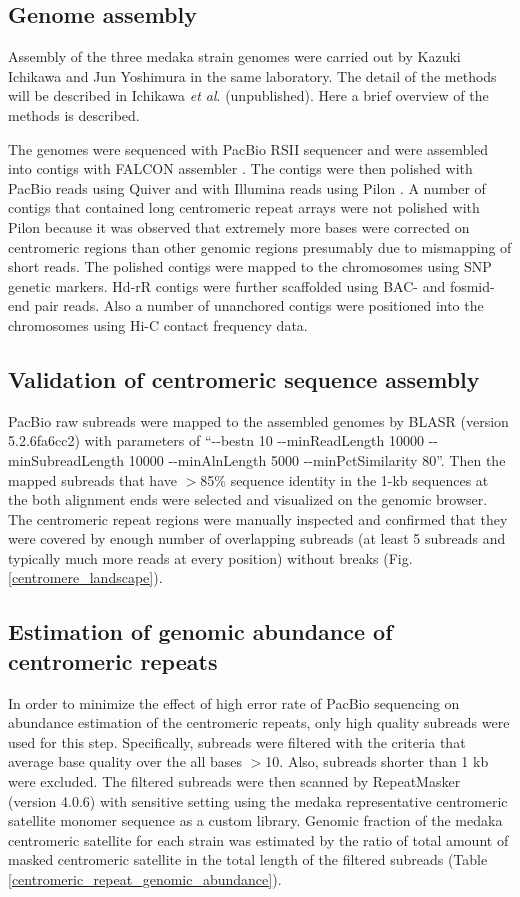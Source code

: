 \subsection*{Genome assembly}
  Assembly of the three medaka strain genomes were carried out by Kazuki Ichikawa and Jun Yoshimura in the same laboratory. The detail of the methods will be described in Ichikawa \textit{et al}. (unpublished). Here a brief overview of the methods is described.

  The genomes were sequenced with PacBio RSII sequencer and were assembled into contigs with FALCON assembler \cite{Chin2016}. The contigs were then polished with PacBio reads using Quiver \cite{Chin2013} and with Illumina reads using Pilon \cite{Walker2014}. A number of contigs that contained long centromeric repeat arrays were not polished with Pilon because it was observed that extremely more bases were corrected on centromeric regions than other genomic regions presumably due to mismapping of short reads. The polished contigs were mapped to the chromosomes using SNP genetic markers. Hd-rR contigs were further scaffolded using BAC- and fosmid-end pair reads. Also a number of unanchored contigs were positioned into the chromosomes using Hi-C contact frequency data.


\subsection*{Validation of centromeric sequence assembly}
  PacBio raw subreads were mapped to the assembled genomes by BLASR (version 5.2.6fa6cc2) \cite{Chaisson2012} with parameters of ``{-}{-}bestn 10 {-}{-}minReadLength 10000 {-}{-}minSubreadLength 10000 {-}{-}minAlnLength 5000 {-}{-}minPctSimilarity 80''. Then the mapped subreads that have $>$85\% sequence identity in the 1-kb sequences at the both alignment ends were selected and visualized on the genomic browser. The centromeric repeat regions were manually inspected and confirmed that they were covered by enough number of overlapping subreads (at least 5 subreads and typically much more reads at every position) without breaks (Fig.\,\ref{centromere_landscape}).


\subsection*{Estimation of genomic abundance of centromeric repeats}
  In order to minimize the effect of high error rate of PacBio sequencing on abundance estimation of the centromeric repeats, only high quality subreads were used for this step. Specifically, subreads were filtered with the criteria that average base quality over the all bases $>$10. Also, subreads shorter than 1 kb were excluded. The filtered subreads were then scanned by RepeatMasker (version 4.0.6) \cite{Smit} with sensitive setting using the medaka representative centromeric satellite monomer sequence as a custom library. Genomic fraction of the medaka centromeric satellite for each strain was estimated by the ratio of total amount of masked centromeric satellite in the total length of the filtered subreads (Table \ref{centromeric_repeat_genomic_abundance}).


